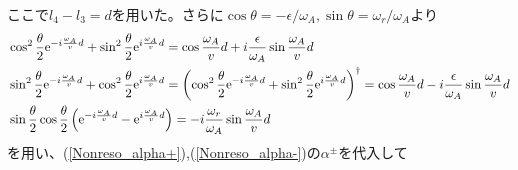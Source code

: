ここで$l_4-l_3=d$を用いた。さらに$\cos\theta=-\epsilon/\omega_A,\sin\theta=\omega_r/\omega_A$より
\begin{align}
&\cos^2 \frac{\theta}{2} \mathrm{e}^{-i\frac{\omega_A}{v}d} +\sin^2 \frac{\theta}{2} \mathrm{e}^{i\frac{\omega_A}{v}d} =\cos \frac{\omega_A}{v}d +i\frac{\epsilon}{\omega_A} \sin \frac{\omega_A}{v}d \\
&\sin^2 \frac{\theta}{2} \mathrm{e}^{-i\frac{\omega_A}{v}d} +\cos^2 \frac{\theta}{2} \mathrm{e}^{i\frac{\omega_A}{v}d} =\left(\cos^2 \frac{\theta}{2} \mathrm{e}^{-i\frac{\omega_A}{v}d} +\sin^2 \frac{\theta}{2} \mathrm{e}^{i\frac{\omega_A}{v}d}\right)^\dagger=\cos \frac{\omega_A}{v}d -i\frac{\epsilon}{\omega_A} \sin \frac{\omega_A}{v}d \\
&\sin\frac{\theta}{2}\cos\frac{\theta}{2} \left(\mathrm{e}^{-i\frac{\omega_A}{v}d}-\mathrm{e}^{i\frac{\omega_A}{v}d}\right) = -i \frac{\omega_r}{\omega_A} \sin \frac{\omega_A}{v}d
\end{align}
を用い、(\ref{Nonreso_alpha+}),(\ref{Nonreso_alpha-})の$\alpha^\pm$を代入して
